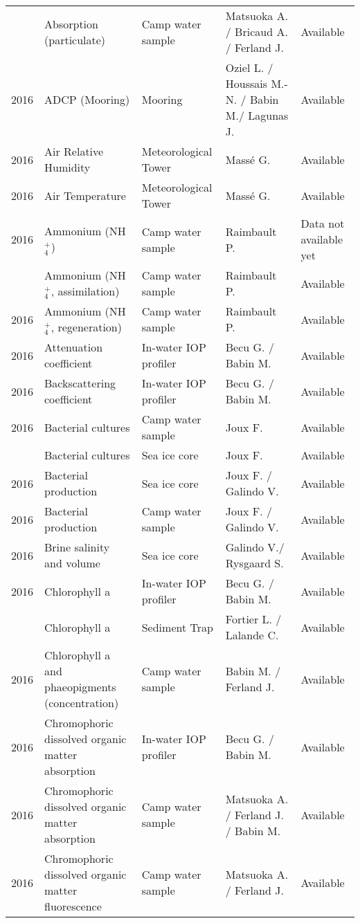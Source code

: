 \documentclass[]{article}
\begin{document}
\begin{landscape}
\begin{longtable}{rllll}
\addlinespace
2016 & Absorption (particulate) & Camp water sample & Matsuoka A. / Bricaud A. / Ferland J. & Available\\
2016 & ADCP (Mooring) & Mooring & Oziel L. / Houssais M.-N. / Babin M./ Lagunas J. & Available\\
2016 & Air Relative Humidity & Meteorological Tower & Massé G. & Available\\
2016 & Air Temperature & Meteorological Tower & Massé G. & Available\\
2016 & Ammonium (NH$^+_4$) & Camp water sample & Raimbault P. & Data not available yet\\
\addlinespace
2016 & Ammonium (NH$^+_4$, assimilation) & Camp water sample & Raimbault P. & Available\\
2016 & Ammonium (NH$^+_4$, regeneration) & Camp water sample & Raimbault P. & Available\\
2016 & Attenuation coefficient & In-water IOP profiler & Becu G. / Babin M. & Available\\
2016 & Backscattering coefficient & In-water IOP profiler & Becu G. / Babin M. & Available\\
2016 & Bacterial cultures & Camp water sample & Joux F. & Available\\
\addlinespace
2016 & Bacterial cultures & Sea ice core & Joux F. & Available\\
2016 & Bacterial production & Sea ice core & Joux F. / Galindo V. & Available\\
2016 & Bacterial production & Camp water sample & Joux F. / Galindo V. & Available\\
2016 & Brine salinity and volume & Sea ice core & Galindo V./ Rysgaard S. & Available\\
2016 & Chlorophyll a & In-water IOP profiler & Becu G. / Babin M. & Available\\
\addlinespace
2016 & Chlorophyll a & Sediment Trap & Fortier L. / Lalande C. & Available\\
2016 & Chlorophyll a and phaeopigments (concentration) & Camp water sample & Babin M. / Ferland J. & Available\\
2016 & Chromophoric dissolved organic matter absorption & In-water IOP profiler & Becu G. / Babin M. & Available\\
2016 & Chromophoric dissolved organic matter absorption & Camp water sample & Matsuoka A. / Ferland J. / Babin M. & Available\\
2016 & Chromophoric dissolved organic matter fluorescence & Camp water sample & Matsuoka A. / Ferland J. & Available\\

\end{longtable}
\end{landscape}
\end{document}
